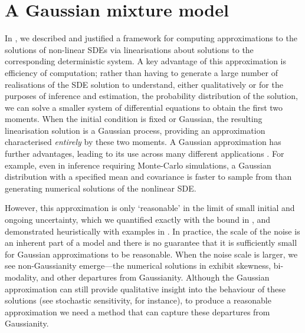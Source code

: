 \chapter{A Gaussian mixture model}\label{ch:gmm}
In , we described and justified a framework for computing approximations to the solutions of non-linear SDEs via linearisations about solutions to the corresponding deterministic system.
A key advantage of this approximation is efficiency of computation; rather than having to generate a large number of realisations of the SDE solution to understand, either qualitatively or for the purposes of inference and estimation, the probability distribution of the solution, we can solve a smaller system of differential equations to obtain the first two moments.
When the initial condition is fixed or Gaussian, the resulting linearisation solution is a Gaussian process, providing an approximation characterised \emph{entirely} by these two moments.
A Gaussian approximation has further advantages, leading to its use across many different applications \citep{KaszasHaller_2020_UniversalUpperEstimate,ArchambeauEtAl_2007_GaussianProcessApproximations,Jazwinski_2014_StochasticProcessesFiltering,SarkkaSolin_2019_AppliedStochasticDifferential,Sanz-AlonsoStuart_2017_GaussianApproximationsSmall}.
For example, even in inference requiring Monte-Carlo simulations, a Gaussian distribution with a specified mean and covariance is faster to sample from than generating numerical solutions of the nonlinear SDE.

However, this approximation is only `reasonable' in the limit of small initial and ongoing uncertainty, which we quantified exactly with the bound in , and demonstrated heuristically with examples in .
In practice, the scale of the noise is an inherent part of a model and there is no guarantee that it is sufficiently small for Gaussian approximations to be reasonable.
When the noise scale is larger, we see non-Gaussianity emerge---the numerical solutions in  exhibit skewness, bi-modality, and other departures from Gaussianity.
Although the Gaussian approximation can still provide qualitative insight into the behaviour of these solutions (see stochastic sensitivity, for instance), to produce a reasonable approximation we need a method that can capture these departures from Gaussianity.

